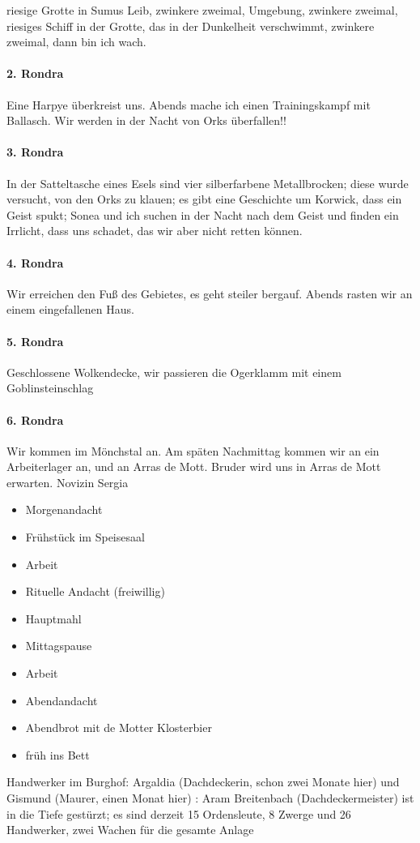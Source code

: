 riesige Grotte in Sumus Leib, zwinkere zweimal, Umgebung, zwinkere zweimal, riesiges Schiff in der Grotte, das in der Dunkelheit verschwimmt, zwinkere zweimal, dann bin ich wach. 

\paragraph{2. Rondra}
Eine Harpye überkreist uns. Abends mache ich einen Trainingskampf mit Ballasch. Wir werden in der Nacht von Orks überfallen!!

\paragraph{3. Rondra}
In der Satteltasche eines Esels sind vier silberfarbene Metallbrocken; diese wurde versucht, von den Orks zu klauen; es gibt eine Geschichte um Korwick, dass ein Geist spukt; Sonea und ich suchen in der Nacht nach dem Geist und finden ein Irrlicht, dass uns schadet, das wir aber nicht retten können.  
\paragraph{4. Rondra}
Wir erreichen den Fuß des Gebietes, es geht steiler bergauf. Abends rasten wir an einem eingefallenen Haus. 

\paragraph{5. Rondra}
Geschlossene Wolkendecke, wir passieren die Ogerklamm mit einem Goblinsteinschlag

\paragraph{6. Rondra}
Wir kommen im Mönchstal an. Am späten Nachmittag kommen wir an ein Arbeiterlager an, und an Arras de Mott. Bruder  wird uns in Arras de Mott erwarten. Novizin Sergia 

\begin{itemize}
\item Morgenandacht
\item Frühstück im Speisesaal
\item Arbeit
\item Rituelle Andacht (freiwillig)
\item Hauptmahl
\item Mittagspause
\item Arbeit
\item Abendandacht
\item Abendbrot mit de Motter Klosterbier
\item früh ins Bett
\end{itemize}
Handwerker im Burghof: Argaldia (Dachdeckerin, schon zwei Monate hier) und Gismund (Maurer, einen Monat hier) : Aram Breitenbach (Dachdeckermeister) ist in die Tiefe gestürzt; es sind derzeit 15 Ordensleute, 8 Zwerge und 26 Handwerker, zwei Wachen für die gesamte Anlage

